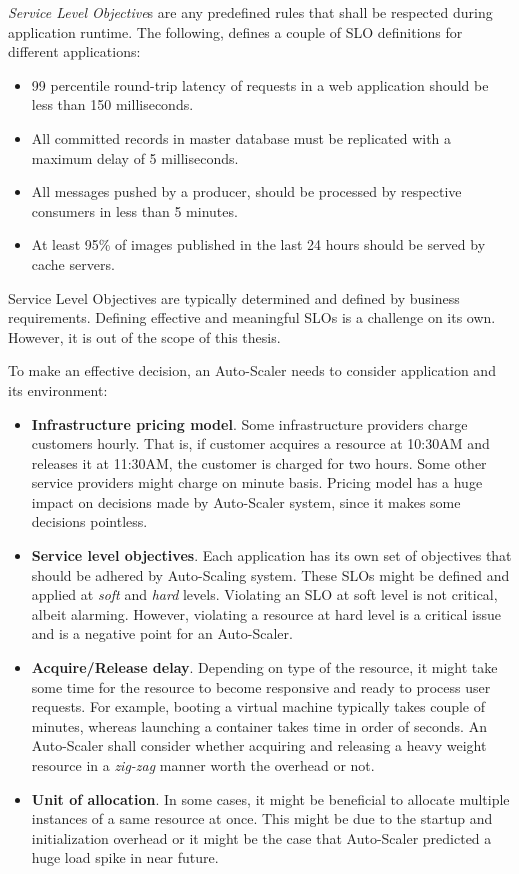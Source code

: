 \emph{Service Level Objective}s are any predefined rules that shall be respected during application runtime. The following, defines a couple of SLO definitions for different applications:
\begin{itemize}
    \item 99 percentile round-trip latency of requests in a web application should be less than 150 milliseconds.
    \item All committed records in master database must be replicated with a maximum delay of 5 milliseconds.
    \item All messages pushed by a producer, should be processed by respective consumers in less than 5 minutes.
    \item At least 95\% of images published in the last 24 hours should be served by cache servers.
\end{itemize}
Service Level Objectives are typically determined and defined by business requirements. Defining effective and meaningful SLOs is a challenge on its own. However, it is out of the scope of this thesis.

To make an effective decision, an Auto-Scaler needs to consider application and its environment:
\begin{itemize}
    \item \textbf{Infrastructure pricing model}. Some infrastructure providers charge customers hourly. That is, if customer acquires a resource at 10:30AM and releases it at 11:30AM, the customer is charged for two hours. Some other service providers might charge on minute basis. Pricing model has a huge impact on decisions made by Auto-Scaler system, since it makes some decisions pointless.
    \item \textbf{Service level objectives}. Each application has its own set of objectives that should be adhered by Auto-Scaling system. These SLOs might be defined and applied at \emph{soft} and \emph{hard} levels. Violating an SLO at soft level is not critical, albeit alarming. However, violating a resource at hard level is a critical issue and is a negative point for an Auto-Scaler.
    \item \textbf{Acquire/Release delay}. Depending on type of the resource, it might take some time for the resource to become responsive and ready to process user requests. For example, booting a virtual machine typically takes couple of minutes, whereas launching a container takes time in order of seconds. An Auto-Scaler shall consider whether acquiring and releasing a heavy weight resource in a \emph{zig-zag} manner worth the overhead or not.
    \item \textbf{Unit of allocation}. In some cases, it might be beneficial to allocate multiple instances of a same resource at once. This might be due to the startup and initialization overhead or it might be the case that Auto-Scaler predicted a huge load spike in near future.
\end{itemize}

